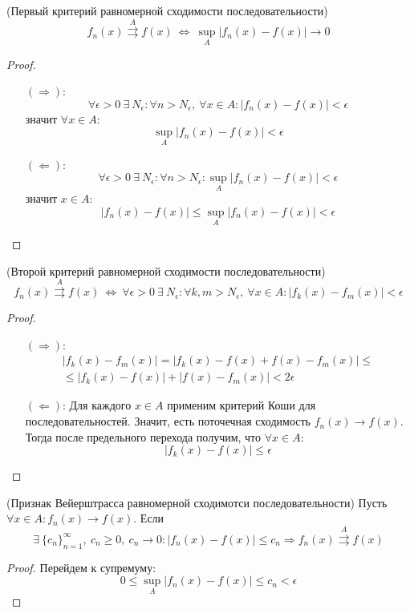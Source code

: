 \begin{theorem} (Первый критерий равномерной сходимости последовательности)
    \[f_n(x) \overset{A}{\rightrightarrows} f(x)\ \Leftrightarrow\ \sup\limits_A|f_n(x)-f(x)|\to 0\]
\end{theorem}
\begin{proof}\tab
    \begin{itemize}
        \item [$(\Rightarrow)$:] 
        \[\forall \epsilon>0\ \exists\ N_{\epsilon}: \forall n>N_{\epsilon},\ \forall x\in A: |f_n(x)-f(x)|<\epsilon\]
        значит $\forall x\in A$:
        \[\sup\limits_A|f_n(x)-f(x)|<\epsilon\]
        \item[$(\Leftarrow)$:]
        \[\forall \epsilon>0\ \exists\ N_{\epsilon}: \forall n>N_{\epsilon}: \sup\limits_A|f_n(x)-f(x)|<\epsilon\]
        значит $x\in A$:
        \[|f_n(x)-f(x)|\leq \sup\limits_A|f_n(x)-f(x)|<\epsilon\]
    \end{itemize}
\end{proof}
\begin{theorem} (Второй критерий равномерной сходимости последовательности)
    \[f_n(x)\overset{A}{\rightrightarrows} f(x)\ \Leftrightarrow\ \forall \epsilon>0\ \exists\ N_{\epsilon}: \forall k,m>N_{\epsilon},\ \forall x\in A: |f_k(x)-f_m(x)|<\epsilon\]
\end{theorem}
\begin{proof}\tab
    \begin{itemize}
        \item[$(\Rightarrow)$:] 
        \begin{multline*}
            |f_k(x)-f_m(x)|=|f_k(x)-f(x)+f(x)-f_m(x)|\leq\\
            \leq |f_k(x)-f(x)|+|f(x)-f_m(x)|<2\epsilon
        \end{multline*}
        \item[$(\Leftarrow)$:]
        Для каждого $x\in A$ применим критерий Коши для последовательностей. Значит, есть поточечная сходимость $f_n(x)\to f(x)$. Тогда после предельного перехода получим, что $\forall x\in A$:
        \[|f_k(x)-f(x)|\leq \epsilon\]
    \end{itemize}    
\end{proof}
\begin{theorem} (Признак Вейерштрасса равномерной сходимотси последовательности)
    Пусть $\forall x\in A: f_n(x)\to f(x)$. Если 
    \[\exists\ \{c_n\}_{n=1}^{\infty},\ c_n\geq 0,\ c_n\to 0: |f_n(x)-f(x)|\leq c_n \Rightarrow f_n(x)\overset{A}{\rightrightarrows} f(x)\]
\end{theorem}
\begin{proof} Перейдем к супремуму:
    \[0\leq \sup\limits_A|f_n(x)-f(x)|\leq c_n<\epsilon\]
\end{proof}